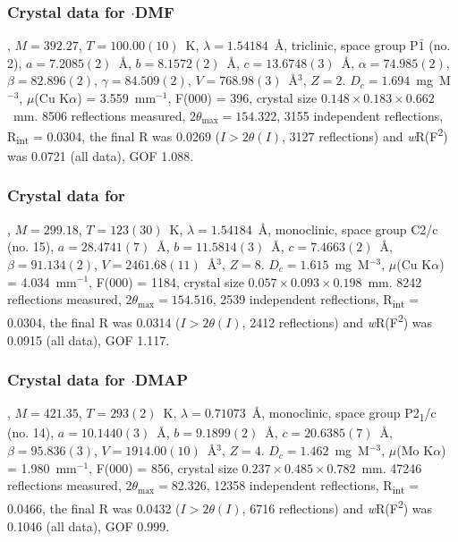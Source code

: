 \begin{refsection}
\subsubsection{Crystal data for \texorpdfstring{$\cdot$DMF}{C16 H15 N3 O4 Se}}
, $M=392.27$, $T=100.00(10)$~K, $\lambda=1.54184$~\AA, triclinic, space group P$\bar{1}$ (no. 2), $a = 7.2085(2)$~\AA, $b = 8.1572(2)$~\AA, $c = 13.6748(3)$~\AA, $\alpha = 74.985(2)$\degree, $\beta = 82.896(2)$\degree, $\gamma = 84.509(2)$\degree, $V = 768.98(3)$~\AA$^{3}$, $Z = 2$. $D_{c}= 1.694$~mg~M$^{-3}$, $\mu$(Cu K$\alpha$) = 3.559~mm$^{-1}$, F(000) = 396, crystal size $0.148 \times 0.183 \times 0.662$~mm. 8506 reflections measured, $2\theta_{\mathrm{max}}=154.322$\degree, 3155 independent reflections, R\textsubscript{int} = 0.0304, the final R was 0.0269 ($I > 2\theta(I)$, 3127 reflections) and \emph{w}R(F\textsuperscript{2}) was 0.0721 (all data), GOF 1.088.

\subsubsection{Crystal data for \texorpdfstring{}{C14 H8 N2 O Se}}
, $M=299.18$, $T=123(30)$~K, $\lambda=1.54184$~\AA, monoclinic, space group C2/c (no. 15), $a = 28.4741(7)$~\AA, $b = 11.5814(3)$~\AA, $c = 7.4663(2)$~\AA, $\beta = 91.134(2)$\degree, $V = 2461.68(11)$~\AA$^{3}$, $Z = 8$. $D_{c}= 1.615$~mg~M$^{-3}$, $\mu$(Cu K$\alpha$) = 4.034~mm$^{-1}$, F(000) = 1184, crystal size $0.057 \times 0.093 \times 0.198$~mm. 8242 reflections measured, $2\theta_{\mathrm{max}}=154.516$\degree, 2539 independent reflections, R\textsubscript{int} = 0.0304, the final R was 0.0314 ($I > 2\theta(I)$, 2412 reflections) and \emph{w}R(F\textsuperscript{2}) was 0.0915 (all data), GOF 1.117.

\subsubsection{Crystal data for \texorpdfstring{$\cdot$DMAP}{C21 H18 N4 O Se}}
, $M=421.35$, $T=293(2)$~K, $\lambda=0.71073$~\AA, monoclinic, space group P2\textsubscript{1}/c (no. 14), $a = 10.1440(3)$~\AA, $b = 9.1899(2)$~\AA, $c = 20.6385(7)$~\AA, $\beta = 95.836(3)$\degree, $V = 1914.00(10)$~\AA$^{3}$, $Z = 4$. $D_{c}= 1.462$~mg~M$^{-3}$, $\mu$(Mo K$\alpha$) = 1.980~mm$^{-1}$, F(000) = 856, crystal size $0.237 \times 0.485 \times 0.782$~mm. 47246 reflections measured, $2\theta_{\mathrm{max}}=82.326$\degree, 12358 independent reflections, R\textsubscript{int} = 0.0466, the final R was 0.0432 ($I > 2\theta(I)$, 6716 reflections) and \emph{w}R(F\textsuperscript{2}) was 0.1046 (all data), GOF 0.999.


\end{refsection}
